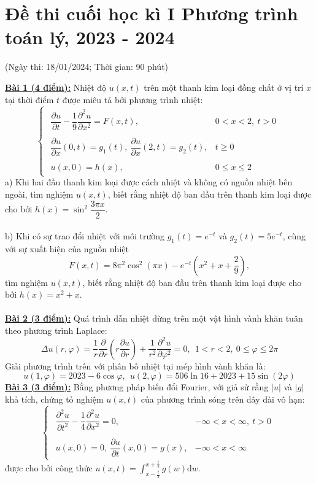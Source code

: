 \documentclass[10.5pt, a4paper]{article}
\begin{document}
\section{Đề thi cuối học kì I Phương trình toán lý, 2023 - 2024}
\begin{center}
	\color{blue}(Ngày thi: 18/01/2024; Thời gian: 90 phút)
\end{center}
\color{red}\underline{\textbf{Bài 1 (4 điểm):}} \color{black}Nhiệt độ $u(x,t)$ trên một thanh kim loại đồng chất ở vị trí $x$ tại thời điểm $t$ được miêu tả bởi phương trình nhiệt: $$\begin{cases}
\begin{array}{ll}
	\dfrac{\partial u}{\partial t}-\dfrac19\dfrac{\partial^2u}{\partial x^2}=F(x,t), & 0<x<2,~t>0\\\\
	\dfrac{\partial u}{\partial x}(0,t)=g_1(t),~\dfrac{\partial u}{\partial x}(2,t)=g_2(t), & t\ge0\\\\
	u(x,0)=h(x), & 0\le x\le2
\end{array}
\end{cases}$$
\color{red}a) \color{black}Khi hai đầu thanh kim loại được cách nhiệt và không có nguồn nhiệt bên ngoài, tìm nghiệm $u(x,t)$, biết rằng nhiệt độ ban đầu trên thanh kim loại được cho bởi $h(x)=\sin^2\dfrac{3\pi x}{2}$.\\\\
\color{red}b) \color{black}Khi có sự trao đổi nhiệt với môi trường $g_1(t)=e^{-t}$ và $g_2(t)=5e^{-t}$, cùng với sự xuất hiện của nguồn nhiệt $$F(x,t)=8\pi^2\cos^2(\pi x)-e^{-t}\left(x^2+x+\dfrac29\right),$$ tìm nghiệm $u(x,t)$, biết rằng nhiệt độ ban đầu trên thanh kim loại được cho bởi $h(x)=x^2+x$.\\\\
\color{red}\underline{\textbf{Bài 2 (3 điểm):}} \color{black}Quá trình dẫn nhiệt dừng trên một vật hình vành khăn tuân theo phương trình Laplace: $$\Delta u(r,\varphi)=\dfrac1r\dfrac{\partial}{\partial r}\left(r\dfrac{\partial u}{\partial r}\right)+\dfrac{1}{r^2}\dfrac{\partial^2u}{\partial\varphi^2}=0,~~1<r<2,~0\le\varphi\le2\pi$$
Giải phương trình trên với phân bố nhiệt tại mép hình vành khăn là: $$u(1,\varphi)=2023-6\cos\varphi,~~u(2,\varphi)=506\ln16+2023+15\sin(2\varphi)$$
\color{red}\underline{\textbf{Bài 3 (3 điểm):}} \color{black}Bằng phương pháp biến đổi Fourier, với giả sử rằng $|u|$ và $|g|$ khả tích, chứng tỏ nghiệm $u(x,t)$ của phương trình sóng trên dây dài vô hạn: $$\begin{cases}
\begin{array}{ll}
	\dfrac{\partial^2u}{\partial t^2}-\dfrac14\dfrac{\partial^2u}{\partial x^2}=0, & -\infty<x<\infty,~t>0\\\\
	u(x,0)=0,~\dfrac{\partial u}{\partial t}(x,0)=g(x), & -\infty<x<\infty
\end{array}
\end{cases}$$
được cho bởi công thức $u(x,t)=\displaystyle\int_{x-\frac t2}^{x+\frac t2}g(w)\text{d}w$.
\end{document}
